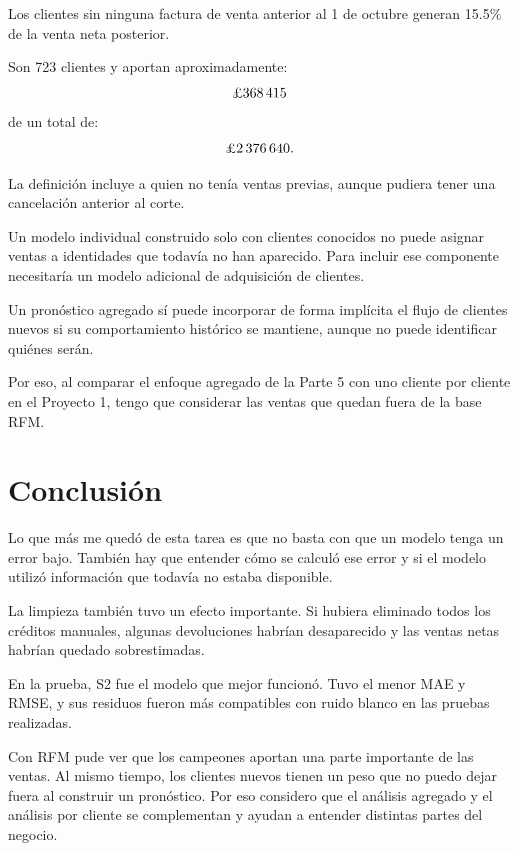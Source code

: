 \documentclass[11pt,letterpaper]{article}
\begin{document}
Los clientes sin ninguna factura de venta anterior al 1 de octubre generan 15.5\% de la venta neta posterior.

Son 723 clientes y aportan aproximadamente:
\[
\text{\pounds}368\,415
\]
de un total de:
\[
\text{\pounds}2\,376\,640.
\]

La definición incluye a quien no tenía ventas previas, aunque pudiera tener una cancelación anterior al corte.

Un modelo individual construido solo con clientes conocidos no puede asignar ventas a identidades que todavía no han aparecido. Para incluir ese componente necesitaría un modelo adicional de adquisición de clientes.

Un pronóstico agregado sí puede incorporar de forma implícita el flujo de clientes nuevos si su comportamiento histórico se mantiene, aunque no puede identificar quiénes serán.

Por eso, al comparar el enfoque agregado de la Parte 5 con uno cliente por cliente en el Proyecto 1, tengo que considerar las ventas que quedan fuera de la base RFM.

\section*{Conclusión}

Lo que más me quedó de esta tarea es que no basta con que un modelo tenga un error bajo. También hay que entender cómo se calculó ese error y si el modelo utilizó información que todavía no estaba disponible.

La limpieza también tuvo un efecto importante. Si hubiera eliminado todos los créditos manuales, algunas devoluciones habrían desaparecido y las ventas netas habrían quedado sobrestimadas.

En la prueba, S2 fue el modelo que mejor funcionó. Tuvo el menor MAE y RMSE, y sus residuos fueron más compatibles con ruido blanco en las pruebas realizadas.

Con RFM pude ver que los campeones aportan una parte importante de las ventas. Al mismo tiempo, los clientes nuevos tienen un peso que no puedo dejar fuera al construir un pronóstico. Por eso considero que el análisis agregado y el análisis por cliente se complementan y ayudan a entender distintas partes del negocio.
\end{document}
